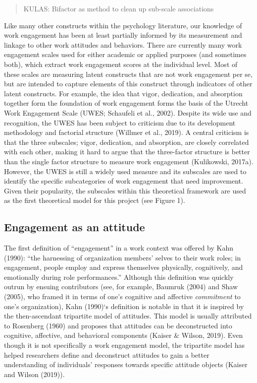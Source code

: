 \documentclass[
  english,
  man]{apa7}
\begin{document}
\begin{quote}
KULAS: Bifactor as method to clean up sub-scale associations
\end{quote}

Like many other constructs within the psychology literature, our knowledge of work engagement has been at least partially informed by its measurement and linkage to other work attitudes and behaviors. There are currently many work engagement scales used for either academic or applied purposes (and sometimes both), which extract work engagement scores at the individual level. Most of these scales are measuring latent constructs that are not work engagement per se, but are intended to capture elements of this construct through indicators of other latent constructs. For example, the idea that vigor, dedication, and absorption together form the foundation of work engagement forms the basis of the Utrecht Work Engagement Scale (UWES; Schaufeli et al., 2002). Despite its wide use and recognition, the UWES has been subject to criticism due to its development methodology and factorial structure (Willmer et al., 2019). A central criticism is that the three subscales; vigor, dedication, and absorption, are closely correlated with each other, making it hard to argue that the three-factor structure is better than the single factor structure to measure work engagement (Kulikowski, 2017a). However, the UWES is still a widely used measure and its subscales are used to identify the specific subcategories of work engagement that need improvement. Given their popularity, the subscales within this theoretical framework are used as the first theoretical model for this project (see Figure 1).

\hypertarget{engagement-as-an-attitude}{%
\subsection{Engagement as an attitude}\label{engagement-as-an-attitude}}

The first definition of ``engagement'' in a work context was offered by Kahn (1990): ``the harnessing of organization members' selves to their work roles; in engagement, people employ and express themselves physically, cognitively, and emotionally during role performances.'' Although this definition was quickly outrun by ensuing contributors (see, for example, Baumruk (2004) and Shaw (2005), who framed it in terms of one's cognitive and affective \emph{commitment} to one's organization), Kahn (1990)`s definition is notable in that it is inspired by the then-ascendant tripartite model of attitudes. This model is usually attributed to Rosenberg (1960) and proposes that attitudes can be deconstructed into cognitive, affective, and behavioral components (Kaiser \& Wilson, 2019). Even though it is not specifically a work engagement model, the tripartite model has helped researchers define and deconstruct attitudes to gain a better understanding of individuals' responses towards specific attitude objects (Kaiser and Wilson (2019)).
\end{document}
